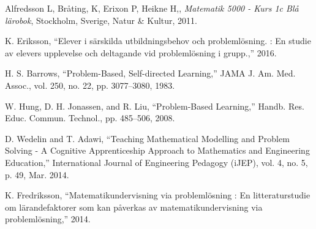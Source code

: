     Alfredsson L, Bråting, K, Erixon P, Heikne H,, \textit{Matematik 5000 - Kurs 1c Blå lärobok}, Stockholm, Sverige, Natur \& Kultur, 2011.
     
    K. Eriksson, “Elever i särskilda utbildningsbehov och problemlösning. : En studie av elevers upplevelse och deltagande vid problemlösning i grupp.,” 2016.
     
     H. S. Barrows, “Problem-Based, Self-directed Learning,” JAMA J. Am. Med. Assoc., vol. 250, no. 22, pp. 3077–3080, 1983.
      
    W. Hung, D. H. Jonassen, and R. Liu, “Problem-Based Learning,” Handb. Res. Educ. Commun. Technol., pp. 485–506, 2008.
    
    D. Wedelin and T. Adawi, “Teaching Mathematical Modelling and Problem Solving - A Cognitive Apprenticeship Approach to Mathematics and Engineering Education,” International Journal of Engineering Pedagogy (iJEP), vol. 4, no. 5, p. 49, Mar. 2014.
    
    K. Fredriksson, “Matematikundervisning via problemlösning : En litteraturstudie om lärandefaktorer som kan påverkas av matematikundervisning via problemlösning,” 2014.
    
